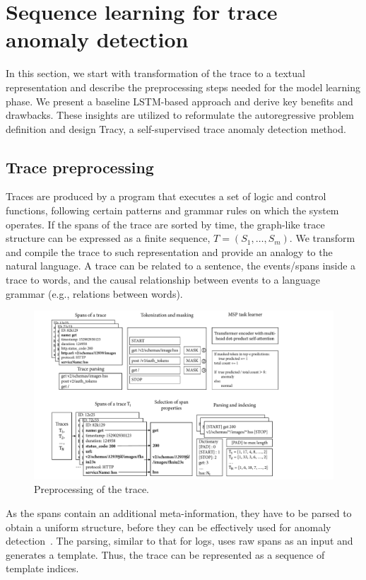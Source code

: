 \section{Sequence learning for trace anomaly detection}
In this section, we start with transformation of the trace to a textual representation and describe the preprocessing steps needed for the model learning phase. We present a baseline LSTM-based approach and derive key benefits and drawbacks. These insights are utilized to reformulate the autoregressive problem definition and design Tracy, a self-supervised trace anomaly detection method. 

\subsection{Trace preprocessing}
Traces are produced by a program that executes a set of logic and control functions, following certain patterns and grammar rules on which the system operates. If the spans of the trace are sorted by time, the graph-like trace structure can be expressed as a finite sequence, $T=(S_1, \dots, S_m)$. We transform and compile the trace to such representation and provide an analogy to the natural language. A trace can be related to a sentence, the events/spans inside a trace to words, and the causal relationship between events to a language grammar (e.g., relations between words).

\begin{figure}[!htbp]
\centerline{\includegraphics[width=1.0\textwidth]{gfx/chap6/tracepreprocessing.pdf}}
\caption{Preprocessing of the trace.}
\label{fig:tracepreprocessing}
\end{figure}

As the spans contain an additional meta-information, they have to be parsed to obtain a uniform structure, before they can be effectively used for anomaly detection~\cite{nedelkoski2019anomaly}. The parsing, similar to that for logs, uses raw spans as an input and generates a template. Thus, the trace can be represented as a sequence of template indices.

